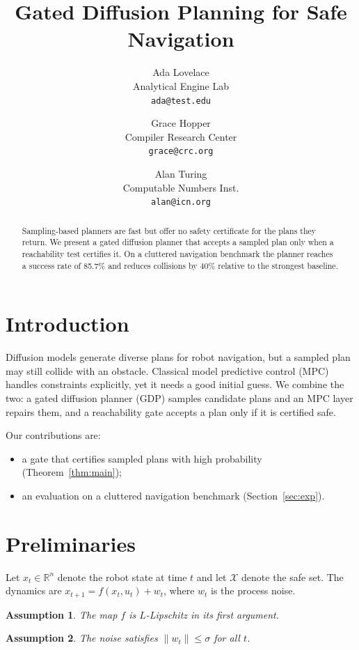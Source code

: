 \documentclass[letterpaper,10pt]{article}
\title{Gated Diffusion Planning for Safe Navigation}
\author{Ada Lovelace\\Analytical Engine Lab\\\texttt{ada@test.edu}
  \and Grace Hopper\\Compiler Research Center\\\texttt{grace@crc.org}
  \and Alan Turing\\Computable Numbers Inst.\\\texttt{alan@icn.org}}
\newtheorem{assumption}{Assumption}
\begin{document}
\maketitle

\begin{abstract}
Sampling-based planners are fast but offer no safety certificate for the plans they return.
We present a gated diffusion planner that accepts a sampled plan only when a reachability test
certifies it. On a cluttered navigation benchmark the planner reaches a success rate of
85.7\% and reduces collisions by 40\% relative to the strongest baseline.
\end{abstract}

\section{Introduction}\label{sec:intro}
Diffusion models generate diverse plans for robot navigation, but a sampled plan may still
collide with an obstacle. Classical model predictive control (MPC) handles constraints
explicitly, yet it needs a good initial guess. We combine the two: a gated diffusion planner
(GDP) samples candidate plans and an MPC layer repairs them, and a reachability gate accepts
a plan only if it is certified safe.

Our contributions are:
\begin{itemize}
  \item a gate that certifies sampled plans with high probability (Theorem~\ref{thm:main});
  \item an evaluation on a cluttered navigation benchmark (Section~\ref{sec:exp}).
\end{itemize}

\section{Preliminaries}\label{sec:prelim}
Let $x_t \in \mathbb{R}^n$ denote the robot state at time $t$ and let $\mathcal{X}$ denote the
safe set. The dynamics are $x_{t+1} = f(x_t, u_t) + w_t$, where $w_t$ is the process noise.

\begin{assumption}\label{asm:lip}
The map $f$ is $L$-Lipschitz in its first argument.
\end{assumption}

\begin{assumption}\label{asm:noise}
The noise satisfies $\|w_t\| \le \sigma$ for all $t$.
\end{assumption}
\end{document}
